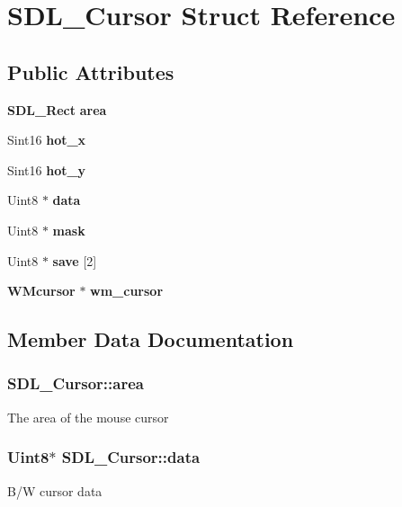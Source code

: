 \section{S\+D\+L\+\_\+\+Cursor Struct Reference}
\label{struct_s_d_l___cursor}
\subsection*{Public Attributes}
\begin{DoxyCompactItemize}
\item 
{\bf S\+D\+L\+\_\+\+Rect} {\bf area}
\item 
Sint16 {\bfseries hot\+\_\+x}\label{struct_s_d_l___cursor_a9560ccf14c4b7eb5dd905c6af57ba3e1}

\item 
Sint16 {\bf hot\+\_\+y}
\item 
Uint8 $\ast$ {\bf data}
\item 
Uint8 $\ast$ {\bf mask}
\item 
Uint8 $\ast$ {\bf save} [2]
\item 
{\bf W\+Mcursor} $\ast$ {\bf wm\+\_\+cursor}
\end{DoxyCompactItemize}


\subsection{Member Data Documentation}
\subsubsection[{area}]{ S\+D\+L\+\_\+\+Cursor\+::area}\label{struct_s_d_l___cursor_afefd14bbad7b59dbf22d63352ced7378}
The area of the mouse cursor 
\subsubsection[{data}]{\setlength{\rightskip}{0pt plus 5cm}Uint8$\ast$ S\+D\+L\+\_\+\+Cursor\+::data}\label{struct_s_d_l___cursor_ae7f8c81028205f9359f0171f2a82ec04}
B/\+W cursor data 
